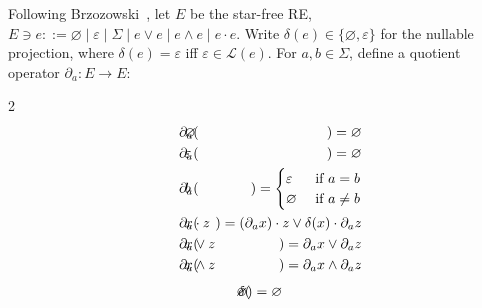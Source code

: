 \documentclass[popl.tex]{subfiles}
\begin{document}
\begin{definition}\label{def:brzozowski_derivative}
  Following Brzozowski~\cite{brzozowski1964derivatives}, let \(E\) be the star-free RE, \(E \ni e ::= \varnothing\mid\varepsilon\mid \Sigma \mid e\vee e\mid e\land e\mid e\cdot e\). Write \(\delta(e)\in\{\varnothing,\varepsilon\}\) for the nullable projection, where \(\delta(e)=\varepsilon\) iff \(\varepsilon\in\mathcal{L}(e)\).  For \(a,b\in\Sigma\), define a quotient operator $\partial_a: E \rightarrow E$:

  \vspace{-0.8cm}
  \begin{multicols}{2}
    \begin{eqnarray*}
      \phantom{--}\partial_a(&\hspace{-0.35cm} \varnothing \hspace{-0.35cm}&) = \varnothing                                           \\
      \phantom{--}\partial_a(&\hspace{-0.35cm} \varepsilon \hspace{-0.35cm}&) = \varnothing                                           \\
      \phantom{--}\partial_a(&\hspace{-0.35cm} b           \hspace{-0.35cm}&) = \begin{cases}\varepsilon &\text{ if } a = b\\ \varnothing &\text{ if } a \neq b \end{cases}\\
      \phantom{--}\partial_a(&\hspace{-0.35cm} x\cdot z    \hspace{-0.35cm}&) = (\partial_a x)\cdot z \vee \delta(x)\cdot\partial_a z \\
      \phantom{--}\partial_a(&\hspace{-0.35cm} x\vee  z    \hspace{-0.35cm}&) =  \partial_a x \vee  \partial_a z                       \\
      \phantom{--}\partial_a(&\hspace{-0.35cm} x\land z    \hspace{-0.35cm}&) =  \partial_a x \land \partial_a z
    \end{eqnarray*} \break\vspace{-0.45cm}
    \begin{eqnarray*}
      \delta(&\hspace{-0.35cm} \varnothing \hspace{-0.35cm}&) = \varnothing                                      \\

\end{eqnarray*}
\end{multicols}
\end{definition}
\end{document}
